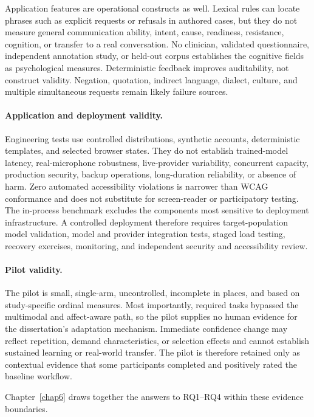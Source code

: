 Application features are operational constructs as well. Lexical rules can locate phrases such as explicit requests or refusals in authored cases, but they do not measure general communication ability, intent, cause, readiness, resistance, cognition, or transfer to a real conversation. No clinician, validated questionnaire, independent annotation study, or held-out corpus establishes the cognitive fields as psychological measures. Deterministic feedback improves auditability, not construct validity. Negation, quotation, indirect language, dialect, culture, and multiple simultaneous requests remain likely failure sources.

\paragraph{Application and deployment validity.}
Engineering tests use controlled distributions, synthetic accounts, deterministic templates, and selected browser states. They do not establish trained-model latency, real-microphone robustness, live-provider variability, concurrent capacity, production security, backup operations, long-duration reliability, or absence of harm. Zero automated accessibility violations is narrower than WCAG conformance and does not substitute for screen-reader or participatory testing. The in-process benchmark excludes the components most sensitive to deployment infrastructure. A controlled deployment therefore requires target-population model validation, model and provider integration tests, staged load testing, recovery exercises, monitoring, and independent security and accessibility review.

\paragraph{Pilot validity.}
The pilot is small, single-arm, uncontrolled, incomplete in places, and based on study-specific ordinal measures. Most importantly, required tasks bypassed the multimodal and affect-aware path, so the pilot supplies no human evidence for the dissertation's adaptation mechanism. Immediate confidence change may reflect repetition, demand characteristics, or selection effects and cannot establish sustained learning or real-world transfer. The pilot is therefore retained only as contextual evidence that some participants completed and positively rated the baseline workflow.

Chapter~\ref{chap6} draws together the answers to RQ1--RQ4 within these evidence boundaries.
